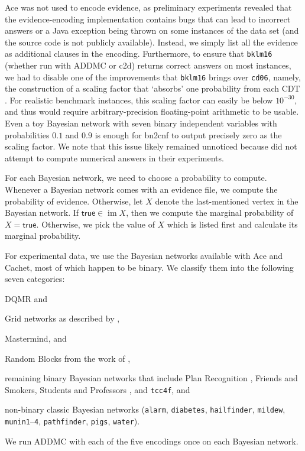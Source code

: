 \documentclass{uai2021} %
\theoremstyle{definition}
\DeclareMathOperator{\im}{im}
\begin{document}
\textsf{Ace} was not used to encode evidence, as
preliminary experiments revealed that the evidence-encoding implementation
contains bugs that can lead to incorrect answers or a Java exception being
thrown on some instances of the data set (and the source code is not publicly
available). Instead, we simply list all the evidence as additional clauses in
the encoding. Furthermore, to ensure that \texttt{bklm16} (whether run with
\textsf{ADDMC} or \textsf{c2d}) returns correct answers on most instances, we
had to disable one of the improvements that \texttt{bklm16} brings over
\texttt{cd06}, namely, the construction of a scaling factor that `absorbs' one
probability from each CDT \citep{DBLP:conf/ecai/BartKLM16}. For realistic
benchmark instances, this scaling factor can easily be below $10^{-30}$, and
thus would require arbitrary-precision floating-point arithmetic to be usable.
Even a toy Bayesian network with seven binary independent variables with
probabilities $0.1$ and $0.9$ is enough for \textsf{bn2cnf} to output precisely
zero as the scaling factor. We note that this issue likely remained unnoticed
because \citet{DBLP:conf/ecai/BartKLM16} did not attempt to compute numerical
answers in their experiments.

For each Bayesian network, we need to choose a probability to compute. Whenever
a Bayesian network comes with an evidence file, we compute the probability of
evidence. Otherwise, let $X$ denote the last-mentioned vertex in the Bayesian
network. If $\mathsf{true} \in \im X$, then we compute the marginal probability
of $X = \mathsf{true}$. Otherwise, we pick the value of $X$ which is listed
first and calculate its marginal probability.

For experimental data, we use the Bayesian networks
available with \textsf{Ace} and \textsf{Cachet}, most of which happen to be
binary. We classify them into the following seven categories:
\begin{itemize*}
\item DQMR and
\item Grid networks as described by \citet{DBLP:conf/aaai/SangBK05},
\item Mastermind, and
\item Random Blocks from the work of \citet{DBLP:journals/ijar/ChaviraDJ06},
\item remaining binary Bayesian networks that include Plan Recognition
  \citep{DBLP:conf/aaai/SangBK05}, Friends and Smokers, Students and Professors
  \citep{DBLP:journals/ijar/ChaviraDJ06}, and \texttt{tcc4f}, and
\item non-binary classic Bayesian networks (\texttt{alarm}, \texttt{diabetes},
  \texttt{hailfinder}, \texttt{mildew}, \texttt{munin1}--\texttt{4},
  \texttt{pathfinder}, \texttt{pigs}, \texttt{water}).
\end{itemize*}
We run \textsf{ADDMC} with each of the five encodings once on each Bayesian
network.
\end{document}
